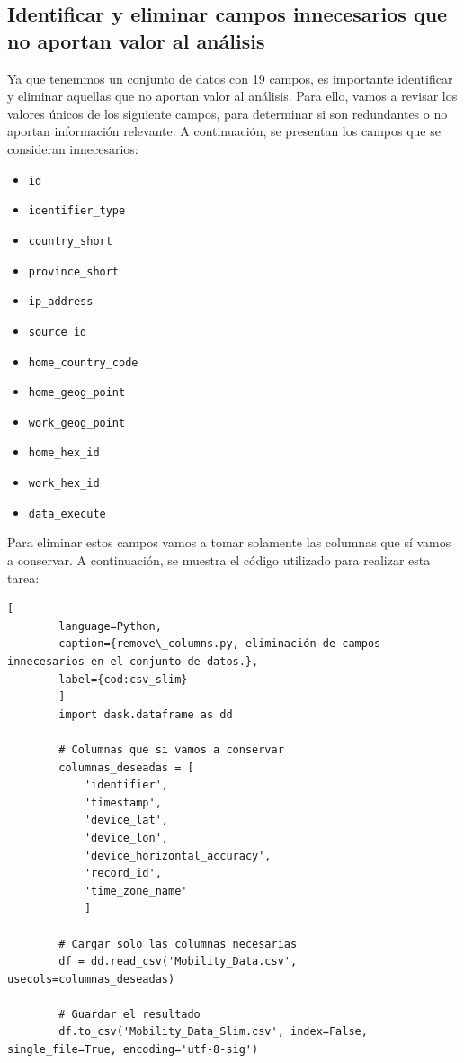 \subsection{Identificar y eliminar campos innecesarios que no aportan valor al análisis}
\noindent Ya que tenemmos un conjunto de datos con 19 campos, es importante identificar y eliminar aquellas que no aportan valor al análisis. Para ello, vamos a revisar los valores únicos de los siguiente campos, para determinar si son redundantes o no aportan información relevante. A continuación, se presentan los campos que se consideran innecesarios:
\begin{itemize}
    \item \texttt{id}
    \item \texttt{identifier\_type}
    \item \texttt{country\_short}
    \item \texttt{province\_short}
    \item \texttt{ip\_address}
    \item \texttt{source\_id}
    \item \texttt{home\_country\_code}
    \item \texttt{home\_geog\_point}
    \item \texttt{work\_geog\_point}
    \item \texttt{home\_hex\_id}
    \item \texttt{work\_hex\_id}
    \item \texttt{data\_execute}
\end{itemize}

\noindent Para eliminar estos campos vamos a tomar solamente las columnas que sí vamos a conservar. A continuación, se muestra el código utilizado para realizar esta tarea:

    \begin{lstlisting}[
        language=Python,
        caption={remove\_columns.py, eliminación de campos innecesarios en el conjunto de datos.},
        label={cod:csv_slim}
        ]
        import dask.dataframe as dd

        # Columnas que si vamos a conservar
        columnas_deseadas = [
            'identifier',
            'timestamp',
            'device_lat',
            'device_lon',
            'device_horizontal_accuracy',
            'record_id',
            'time_zone_name'
            ]

        # Cargar solo las columnas necesarias
        df = dd.read_csv('Mobility_Data.csv', usecols=columnas_deseadas)

        # Guardar el resultado
        df.to_csv('Mobility_Data_Slim.csv', index=False, single_file=True, encoding='utf-8-sig')
    \end{lstlisting}

